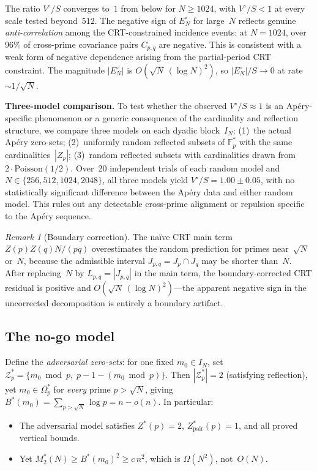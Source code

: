 \documentclass[11pt]{article}
\theoremstyle{definition}
\theoremstyle{remark}
\newtheorem{remark}[theorem]{Remark}
\begin{document}
The ratio $V^\circ/S$ converges to~$1$
from below for $N \ge 1024$, with $V^\circ/S < 1$
at every scale tested beyond~$512$.
The negative sign of $E_N^\circ$ for large~$N$
reflects genuine \emph{anti-correlation} among
the CRT-constrained incidence events:
at $N = 1024$, over $96\%$ of cross-prime
covariance pairs $C_{p,q}$ are negative.
This is consistent with a weak form
of negative dependence arising from the partial-period
CRT constraint.
The magnitude $|E_N^\circ|$ is $O(\sqrt{N}\,(\log N)^2)$,
so $|E_N^\circ|/S \to 0$ at rate~$\sim 1/\sqrt{N}$.

\textbf{Three-model comparison.}
To test whether the observed $V^\circ/S \approx 1$
is an Ap\'ery-specific phenomenon or a generic consequence
of the cardinality and reflection structure,
we compare three models on each dyadic block~$I_N$:
(1)~the actual Ap\'ery zero-sets;
(2)~uniformly random reflected subsets of $\mathbb{F}_p^*$
  with the same cardinalities~$|Z_p|$;
(3)~random reflected subsets with cardinalities drawn
  from $2 \cdot \mathrm{Poisson}(1/2)$.
Over~20 independent trials of each random model and
$N \in \{256, 512, 1024, 2048\}$, all three models yield
$V^\circ/S = 1.00 \pm 0.05$, with no statistically significant
difference between the Ap\'ery data and either random model.
This rules out any detectable cross-prime alignment
or repulsion specific to the Ap\'ery sequence.

\begin{remark}[Boundary correction]
The na\"ive CRT main term $Z(p)Z(q)N/(pq)$ overestimates
the random prediction for primes near~$\sqrt{N}$ or~$N$,
because the admissible interval $J_{p,q} = J_p \cap J_q$
may be shorter than~$N$.
After replacing~$N$ by $L_{p,q} = |J_{p,q}|$ in the main
term, the boundary-corrected CRT residual is positive and
$O(\sqrt{N}\,(\log N)^2)$---the apparent negative sign in the
uncorrected decomposition is entirely a boundary artifact.
\end{remark}

\subsection{The no-go model}\label{ssec:nogo}

Define the \emph{adversarial zero-sets}: for one
fixed $m_0 \in I_N$, set
$\mathcal{Z}_p^* = \{m_0 \bmod p,\; p - 1 - (m_0 \bmod p)\}$.
Then $|\mathcal{Z}_p^*| = 2$ (satisfying reflection),
yet $m_0 \in \Omega_p^*$ for \emph{every} prime
$p > \sqrt{N}$, giving
$B^*(m_0) = \sum_{p > \sqrt{N}} \log p = n - o(n)$.
In particular:
\begin{itemize}
\item The adversarial model satisfies
  $Z^*(p) = 2$, $Z_{\mathrm{pair}}^*(p) = 1$,
  and all proved vertical bounds.
\item Yet $M_2^*(N) \ge B^*(m_0)^2 \ge c\,n^2$,
  which is $\Omega(N^2)$, not~$O(N)$.
\end{itemize}
\end{document}
